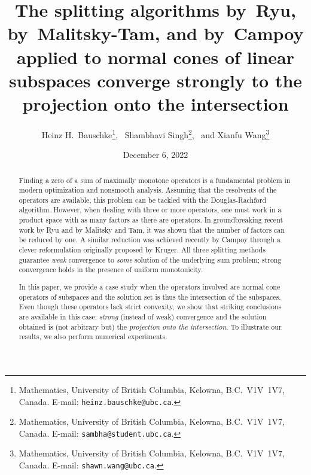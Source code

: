 \documentclass[11pt]{article}
\theoremstyle{definition}
\begin{document}
\title{\textsf{
The splitting algorithms by~Ryu, by~Malitsky-Tam, and 
by~Campoy
applied to normal cones of linear subspaces
converge strongly to the projection onto the intersection 
}}

\author{
Heinz H.\ Bauschke\thanks{
Mathematics, University
of British Columbia,
Kelowna, B.C.\ V1V~1V7, Canada. E-mail:
\texttt{heinz.bauschke@ubc.ca}.},~
Shambhavi Singh\thanks{
Mathematics, University
of British Columbia,
Kelowna, B.C.\ V1V~1V7, Canada. E-mail:
\texttt{sambha@student.ubc.ca}.},~ 
and
Xianfu Wang\thanks{
Mathematics, University
of British Columbia,
Kelowna, B.C.\ V1V~1V7, Canada. E-mail:
\texttt{shawn.wang@ubc.ca}.}
}

\date{December 6, 2022} 
\maketitle


\vskip 8mm

\begin{abstract} 
Finding a zero of a sum of maximally monotone operators is a fundamental problem in modern optimization and nonsmooth analysis. 
Assuming that the resolvents of the operators are available, this problem
can be tackled with the Douglas-Rachford algorithm.
However, when dealing with three or more operators, one must 
work in a product space with as many factors as there are operators.
In groundbreaking recent work by Ryu and by Malitsky and Tam, it was 
shown that the number of factors can be reduced by one. 
A similar reduction was achieved recently by Campoy through a clever 
reformulation originally proposed by Kruger. 
All three splitting methods guarantee
\emph{weak} convergence to \emph{some} solution
of the underlying sum problem; strong convergence holds in
the presence of uniform monotonicity.

In this paper, we provide a case study when the operators involved
are normal cone operators of subspaces and the solution set is thus
the intersection of the subspaces. Even though these operators 
lack strict convexity, we show that striking  
conclusions are available in this case: \emph{strong} (instead of weak) 
convergence and
the solution obtained is (not arbitrary but) the \emph{projection onto the intersection}.
To illustrate our results, we also perform
numerical experiments. 
\end{abstract}
\end{document}
